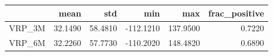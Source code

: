 \begin{tabular}{lrrrrr}
\toprule
 & mean & std & min & max & frac\_positive \\
\midrule
VRP\_3M & 32.1490 & 58.4810 & -112.1210 & 137.9500 & 0.7220 \\
VRP\_6M & 32.2260 & 57.7730 & -110.2020 & 148.4820 & 0.6890 \\
\bottomrule
\end{tabular}
